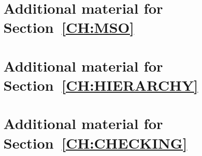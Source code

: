 \documentclass[a4paper,12pt,titlepage,oneside,openany]{book}
\begin{document}
\newpage


\newpage

\ifappendix

\appendix

\chapter{Additional material for Section~\ref{CH:MSO}}
\label{apx:MSO}


\chapter{Additional material for Section~\ref{CH:HIERARCHY}}
\label{apx:hierarchy}


\chapter{Additional material for Section~\ref{CH:CHECKING}}
\label{apx:checking}



\fi

\ifcomments


% 
% 
\fi
\end{document}
